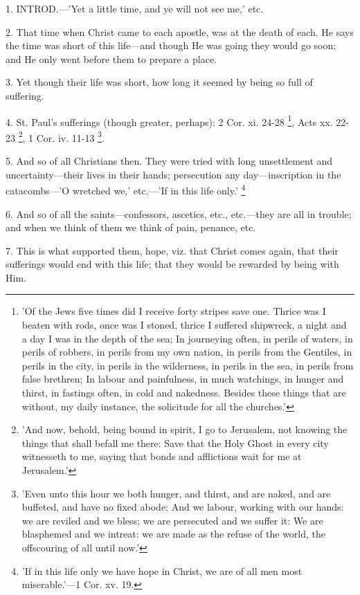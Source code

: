 
1. INTROD.—'Yet
a little time, and ye will not see me,' etc.

2. That time when Christ came to each apostle,
was at the death of each. He says the time was short of this
life—and though He was going they would go soon; and He only went
before them to prepare a place.

3. Yet though their life was short, how long it
seemed by being so full of suffering.

4. St. Paul's sufferings (though greater,
perhaps): 2 Cor. xi. 24-28 \footnote{'Of the Jews five times
did I receive forty stripes save one. Thrice was I beaten with rods,
once was I stoned, thrice I suffered shipwreck, a night and a day I
was in the depth of the sea; In journeying often, in perils of waters,
in perils of robbers, in perils from my own nation, in perils from the
Gentiles, in perils in the city, in perils in the wilderness, in
perils in the sea, in perils from false brethren; In labour and
painfulness, in much watchings, in hunger and thirst, in fastings
often, in cold and nakedness. Besides these things that are without,
my daily instance, the solicitude for all the churches.'},
Acts xx. 22-23 \footnote{'And now, behold, being
bound in spirit, I go to Jerusalem, not knowing the things that shall
befall me there: Save that the Holy Ghost in every city witnesseth to
me, saying that bonds and afflictions wait for me at Jerusalem.'}, 1 Cor.
iv. 11-13 \footnote{'Even unto this hour we
both hunger, and thirst, and are naked, and are buffeted, and have no
fixed abode; And we labour, working with our hands: we are reviled and
we bless; we are persecuted and we suffer it: We are blasphemed and we
intreat: we are made as the refuse of the world, the offscouring of
all until now.'}.

5. And so of all Christians then. They were tried
with long unsettlement and uncertainty—their lives in their hands;
persecution any day—inscription in the catacombs—'O wretched we,'
etc.—'If in this life only.' \footnote{'If in this life only we
have hope in Christ, we are of all men most miserable.'—1 Cor. xv.
19.}

6. And so of all the saints—confessors,
ascetics, etc., etc.—they are all in trouble; and when we think of
them we think of pain, penance, etc.

7. This is what supported them, hope, viz. that
Christ comes again, that their sufferings would end with this life;
that they would be rewarded by being with Him.

